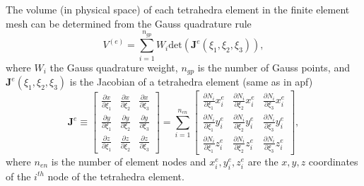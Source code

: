 The volume (in physical space) of each tetrahedra element in the finite element mesh can be determined from the Gauss quadrature rule
%
\begin{equation}
V^{(e)} = \sum_{i=1}^{n_{gp}} W_i \text{det}(\pmb{J}^e(\xi_1,\xi_2,\xi_3)),
\end{equation}
%
where $W_i$ the Gauss quadrature weight, $n_{gp}$ is the number of Gauss points, and $\pmb{J}^e(\xi_1,\xi_2,\xi_3)$ is the Jacobian of a tetrahedra element (same as in apf)
%
\begin{equation}
\pmb{J}^e \equiv 
\begin{bmatrix}
\frac{\partial x}{\partial \xi_1} & \frac{\partial x}{\partial \xi_2} & \frac{\partial x}{\partial \xi_3} \\
\frac{\partial y}{\partial \xi_1} & \frac{\partial y}{\partial \xi_2} & \frac{\partial y}{\partial \xi_3} \\
\frac{\partial z}{\partial \xi_1} & \frac{\partial z}{\partial \xi_2} & \frac{\partial z}{\partial \xi_3} 
\end{bmatrix} = 
%
\sum_{i=1}^{n_{en}}
\begin{bmatrix}
\frac{\partial N_i}{\partial \xi_1} x_i^e & \frac{\partial N_i}{\partial \xi_2} x_i^e & \frac{\partial N_i}{\partial \xi_3} x_i^e \\
%
\frac{\partial N_i}{\partial \xi_1}y_i^e & \frac{\partial N_i}{\partial \xi_2}y_i^e & \frac{\partial N_i}{\partial \xi_3}y_i^e \\
%
\frac{\partial N_i}{\partial \xi_1}z_i^e & \frac{\partial N_i}{\partial \xi_2}z_i^e & \frac{\partial N_i}{\partial \xi_3}z_i^e 
\end{bmatrix},
\label{eq:jacobian}
\end{equation}
%
where $n_{en}$ is the number of element nodes and $x_i^e, y_i^e, z_i^e$ are the $x,y,z$ coordinates of the $i^{th}$ node of the tetrahedra element.

